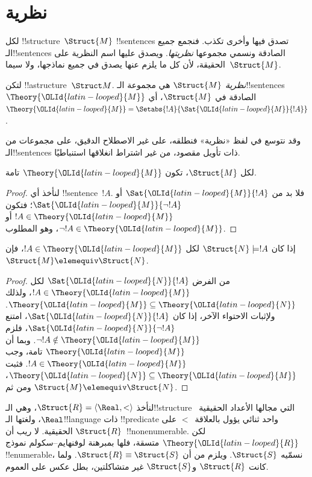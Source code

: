 \documentclass[../../../include/open-logic-section]{subfiles}
\begin{document}

\section{نظرية }

لكل !!{structure}~$\Struct{M}$ !!{sentence}s تصدق فيها
وأخرى تكذب. فنجمع جميع الـ!!{sentence}s الصادقة ونسمي مجموعها
\emph{نظريتها}. ويصدق عليها اسم النظرية على الحقيقة، لأن كل
ما يلزم عنها يصدق في جميع نماذجها، ولا سيما~$\Struct{M}$.

\begin{defn}
  لتكن !!a{structure}~$\Struct M$. \emph{نظرية} $\Struct{M}$ هي مجموعة
  الـ!!{sentence}s~$\Theory{\OLId{latin-looped}{M}}$ الصادقة في $\Struct{M}$، أي
  $\Theory{\OLId{latin-looped}{M}} = \Setabs{!A}{\Sat{\OLId{latin-looped}{M}}{!A}}$.
\end{defn}

وقد نتوسع في لفظ «نظرية» فنطلقه، على غير الاصطلاح الدقيق، على مجموعات
من الـ!!{sentence}s ذات تأويل مقصود، من غير اشتراط انغلاقها استنباطيًا.

\begin{prop}
لكل $\Struct{M}$، تكون $\Theory{\OLId{latin-looped}{M}}$ تامة.
\end{prop}

\begin{proof}
لنأخذ أي !!{sentence}~$!A$. فلا بد من $\Sat{\OLId{latin-looped}{M}}{!A}$ أو
$\Sat{\OLId{latin-looped}{M}}{\lnot !A}$؛ فتكون $!A \in \Theory{\OLId{latin-looped}{M}}$ أو
$\lnot !A \in \Theory{\OLId{latin-looped}{M}}$، وهو المطلوب.
\end{proof}

\begin{prop}
  إذا كان $\Struct{N} \models !A$ لكل $!A \in \Theory{\OLId{latin-looped}{M}}$، فإن
  $\Struct{M} \elemequiv \Struct{N}$.
\end{prop}

\begin{proof}
من الفرض $\Sat{\OLId{latin-looped}{N}}{!A}$ لكل $!A \in \Theory{\OLId{latin-looped}{M}}$، ولذلك
$\Theory{\OLId{latin-looped}{M}} \subseteq \Theory{\OLId{latin-looped}{N}}$. ولإثبات الاحتواء الآخر،
إذا كان $\Sat{\OLId{latin-looped}{N}}{!A}$، امتنع $\Sat{\OLId{latin-looped}{N}}{\lnot !A}$، فلزم
$\lnot !A \notin \Theory{\OLId{latin-looped}{M}}$. وبما أن $\Theory{\OLId{latin-looped}{M}}$ تامة،
وجب $!A \in \Theory{\OLId{latin-looped}{M}}$. فثبت
$\Theory{\OLId{latin-looped}{N}} \subseteq \Theory{\OLId{latin-looped}{M}}$، ومن ثم
$\Struct{M} \elemequiv \Struct{N}$.
\end{proof}

\begin{rem}
  لنأخذ $\Struct{R} = \langle\Real, <\rangle$، وهي الـ!!{structure}
  التي مجالها الأعداد الحقيقية~$\Real$، ولغتها الـ!!{language}
  ذات !!{predicate} واحد ثنائي يؤول بالعلاقة~$<$ على الحقيقية.
  لا ريب أن $\Struct{R}$~!!{nonenumerable}. لكن $\Theory{\OLId{latin-looped}{R}}$
  متسقة، فلها بمبرهنة لوفنهايم--سكولم نموذج !!{enumerable}،
  نسمّيه $\Struct{S}$. ويلزم من  أن
  $\Struct{R} \equiv \Struct{S}$. ولما كانت $\Struct{R}$
  و$\Struct{S}$ غير متشاكلتين، بطل عكس 
  على العموم.
\end{rem}
\end{document}
